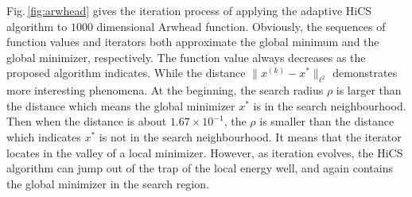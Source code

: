 Fig.\,\ref{fig:arwhead} gives the iteration process of
applying the adaptive HiCS algorithm to $1000$ dimensional Arwhead function.
Obviously, the sequences of function values and iterators both
approximate the global minimum and the global minimizer, respectively. 
The function value always decreases as the proposed algorithm
indicates. While the distance $\|x^{(k)}-x^*\|_{\ell^2}$
demonstrates more interesting phenomena. At the beginning, the
search radius $\rho$ is larger than the distance which means the global
minimizer $x^*$ is in the search neighbourhood. Then when the distance is
about $1.67\times 10^{-1}$, the $\rho$ is smaller than the
distance which indicates $x^*$ is not in the search neighbourhood. 
It means that the iterator locates in the valley of a local minimizer. 
However, as iteration evolves, the HiCS algorithm can jump out of
the trap of the local energy well, and again contains the global
minimizer in the search region.



%
%
%




